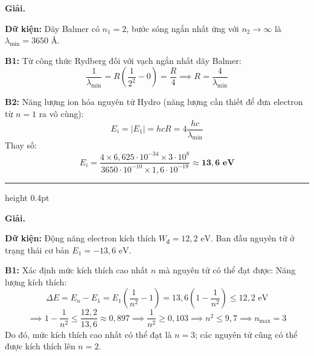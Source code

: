 \documentclass[11pt,a4paper]{article}
\renewcommand{\boldsymbol}[1]{\symbf{#1}}
\let\DeBaiOriginal\DeBai
\renewcommand{\DeBai}[1]{\par\Needspace{5\baselineskip}\DeBaiOriginal{#1}}
\newcommand{\PhanCachBai}{%
  \par\Needspace{7\baselineskip}%
  \addvspace{6pt}%
  {\color{black!40}\hrule height 0.4pt}%
  \nobreak\vspace{7pt}\nobreak
}
\begin{document}

\textbf{Giải.}

\textbf{Dữ kiện:} Dãy Balmer có $n_1 = 2$, bước sóng ngắn nhất ứng với $n_2 \to \infty$ là $\lambda_{\min} = 3650\text{ \AA}$.

\textbf{B1:} Từ công thức Rydberg đối với vạch ngắn nhất dãy Balmer:
\begin{equation*}
    \frac{1}{\lambda_{\min}} = R\left(\frac{1}{2^2} - 0\right) = \frac{R}{4} \implies R = \frac{4}{\lambda_{\min}}
\end{equation*}

\textbf{B2:} Năng lượng ion hóa nguyên tử Hydro (năng lượng cần thiết để đưa electron từ $n = 1$ ra vô cùng):
\begin{equation*}
    E_i = |E_1| = h c R = 4 \frac{h c}{\lambda_{\min}}
\end{equation*}
Thay số:
\begin{equation*}
    E_i = \frac{4 \times 6{,}625 \cdot 10^{-34} \times 3 \cdot 10^8}{3650 \cdot 10^{-10} \times 1{,}6 \cdot 10^{-19}} \approx \boldsymbol{13{,}6\text{ eV}}
\end{equation*}

\PhanCachBai


\textbf{Giải.}

\textbf{Dữ kiện:} Động năng electron kích thích $W_{\text{đ}} = 12{,}2\text{ eV}$. Ban đầu nguyên tử ở trạng thái cơ bản $E_1 = -13{,}6\text{ eV}$.

\textbf{B1:} Xác định mức kích thích cao nhất $n$ mà nguyên tử có thể đạt được:
Năng lượng kích thích:
\begin{equation*}
    \Delta E = E_n - E_1 = E_1\left(\frac{1}{n^2} - 1\right) = 13{,}6\left(1 - \frac{1}{n^2}\right) \le 12{,}2\text{ eV}
\end{equation*}
\begin{equation*}
    \implies 1 - \frac{1}{n^2} \le \frac{12{,}2}{13{,}6} \approx 0{,}897 \implies \frac{1}{n^2} \ge 0{,}103 \implies n^2 \le 9{,}7 \implies n_{\max} = 3
\end{equation*}
Do đó, mức kích thích cao nhất có thể đạt là $n=3$; các nguyên tử cũng có thể được kích thích lên $n=2$.
\end{document}
